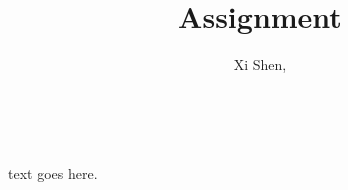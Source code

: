 \documentclass[11pt,a4paper]{article}
\makeatletter
\renewcommand{\maketitle}{
  \begin{center}
    \vspace{2ex}
    {\huge \textsc{\@title}}
    \vspace{4ex}
    \\
    \@author \hfill \@date
  \end{center}
  \vspace{4ex}
}
\makeatother
\begin{document}
\title{Assignment }

\author{Xi Shen, }

\maketitle

text goes here.
\end{document}
